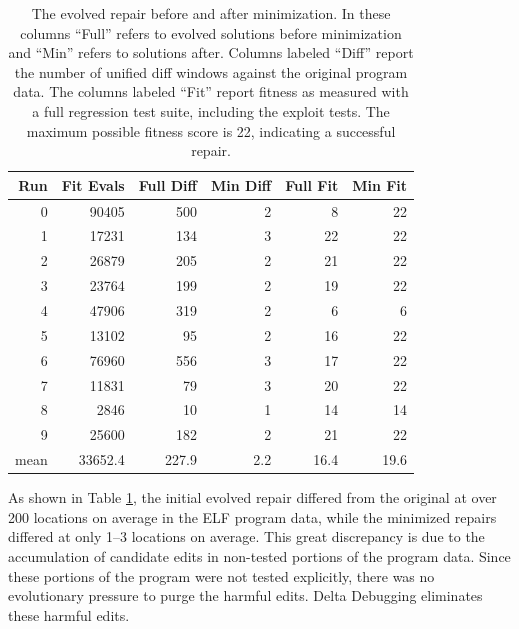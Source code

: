 \documentclass{sigcomm-alternate}
\begin{document}
\begin{table}[htb]
\centering
\begin{tabular}{rrrrrr}
Run  & Fit Evals & Full Diff & Min Diff & Full Fit & Min Fit \\
\toprule
0    & 90405     & 500       & 2        & 8        & 22      \\
1    & 17231     & 134       & 3        & 22       & 22      \\
2    & 26879     & 205       & 2        & 21       & 22      \\
3    & 23764     & 199       & 2        & 19       & 22      \\
4    & 47906     & 319       & 2        & 6        & 6       \\
5    & 13102     & 95        & 2        & 16       & 22      \\
6    & 76960     & 556       & 3        & 17       & 22      \\
7    & 11831     & 79        & 3        & 20       & 22      \\
8    & 2846      & 10        & 1        & 14       & 14      \\
9    & 25600     & 182       & 2        & 21       & 22      \\
\bottomrule
mean & 33652.4   & 227.9     & 2.2      & 16.4     & 19.6    \\
\end{tabular}
\caption{\label{minimized-stats}The 
evolved repair before and after minimization.  In these columns ``Full''
refers to evolved solutions before minimization and ``Min'' refers to
solutions after.  Columns labeled ``Diff'' report the number
of unified diff windows against the original program data. The columns
labeled ``Fit'' report fitness as measured with a full regression test
suite, including the exploit tests.  The maximum possible fitness
score is 22, indicating a successful repair.}
\end{table}

As shown in Table \ref{minimized-stats}, the initial evolved repair
differed from the original at over 200 locations on average in the ELF
program data, while the minimized repairs differed at only 1--3
locations on average.  This great discrepancy is due to the
accumulation of candidate edits in non-tested portions of the program
data.  Since these portions of the program were not tested explicitly, there was
no evolutionary pressure to purge the harmful edits.  
Delta Debugging eliminates these harmful edits.
\end{document}
